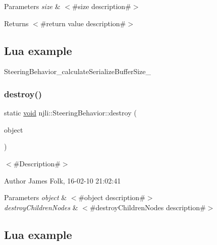 \begin{DoxyParams}{Parameters}
{\em size} & $<$\#size description\#$>$\\
\hline
\end{DoxyParams}
\begin{DoxyReturn}{Returns}
$<$\#return value description\#$>$
\end{DoxyReturn}
\hypertarget{classnjli_1_1_steering_behavior_wander_ex1}{}\subsection{Lua example}\label{classnjli_1_1_steering_behavior_wander_ex1}

\begin{DoxyCodeInclude}
\end{DoxyCodeInclude}
Steering\+Behavior\+\_\+calculate\+Serialize\+Buffer\+Size\+\_\+ \mbox{\label{classnjli_1_1_steering_behavior_ad1867854ab502ef50adba56ea4da1d84}} 
\subsubsection{\texorpdfstring{destroy()}{destroy()}}
{\footnotesize\ttfamily static \mbox{\hyperlink{_thread_8h_af1e856da2e658414cb2456cb6f7ebc66}{void}} njli\+::\+Steering\+Behavior\+::destroy (\begin{DoxyParamCaption}\item[{\mbox{\hyperlink{classnjli_1_1_steering_behavior}{Steering\+Behavior}} $\ast$}]{object }\end{DoxyParamCaption})\hspace{0.3cm}{\ttfamily [static]}}



$<$\#\+Description\#$>$ 

\begin{DoxyAuthor}{Author}
James Folk, 16-\/02-\/10 21\+:02\+:41
\end{DoxyAuthor}

\begin{DoxyParams}{Parameters}
{\em object} & $<$\#object description\#$>$ \\
\hline
{\em destroy\+Children\+Nodes} & $<$\#destroy\+Children\+Nodes description\#$>$\\
\hline
\end{DoxyParams}
\hypertarget{classnjli_1_1_steering_behavior_wander_ex1}{}\subsection{Lua example}\label{classnjli_1_1_steering_behavior_wander_ex1}

